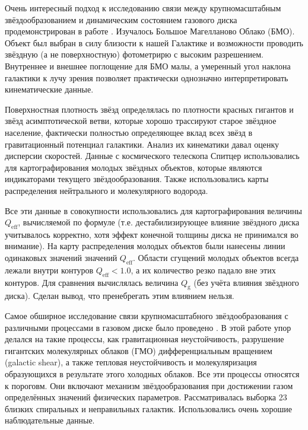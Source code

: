 \documentclass[russian,12pt]{article}
\begin{document}
Очень интересный подход к исследованию связи между крупномасштабным 
звёздообразованием и динамическим состоянием газового диска 
продемонстрирован в работе \cite{Yang+07}. Изучалось Большое 
Магелланово Облако (БМО). Объект был выбран в силу близости к нашей Галактике 
и возможности проводить звёздную (а не поверхностную) фотометрирю с 
высоким разрешением. Внутреннее и внешнее поглощение для БМО малы, а 
умеренный угол наклона галактики к лучу зрения позволяет практически 
однозначно интерпретировать кинематические данные. 

Поверхностная плотность звёзд определялась по плотности красных гигантов 
и звёзд асимптотической ветви, которые хорошо трассируют старое звёздное 
население, фактически полностью определяющее вклад всех звёзд в 
гравитационный потенциал галактики. Анализ их кинематики давал оценку 
дисперсии скоростей. Данные с космического телескопа 
Спитцер использовались для картографирования молодых звёздных объектов, 
которые являются индикаторами текущего звёздообразования. Также 
использовались карты распределения нейтрального и молекулярного 
водорода. 

Все эти данные в совокупности использовались для картографирования величины 
$Q_\mathrm{eff}$, вычисляемой по формуле \cite{Rafikov01} 
(т.е. дестабилизирующее влияние звёздного диска учитывалось корректно, 
хотя эффект конечной толщины диска не принимался во внимание). 
На карту распределения молодых объектов были нанесены линии одинаковых 
значений значений $Q_\mathrm{eff}$. Области сгущений молодых объектов 
всегда лежали внутри контуров $Q_\mathrm{eff} < 1.0$, а их количество 
резко падало вне этих контуров. Для сравнения вычислялась величина 
$Q_\mathrm{g}$ (без учёта влияния звёздного диска). Сделан вывод, что 
пренебрегать этим влиянием нельзя.

Самое обширное исследование связи крупномасштабного звёздообразования с 
различными процессами в газовом диске было проведено \cite{Leroy+08}. 
В этой работе упор делался на такие процессы, как гравитационная 
неустойчивость, разрушение гигантских молекулярных 
облаков (ГМО) дифференциальным вращением (galactic shear), а также 
тепловая неустойчивость и молекуляризация образующихся в результате 
этого холодных облаков. Все эти процессы относятся к пороговм.  
Они включают механизм звёздообразования при достижении газом 
определённых значений физических параметров. Рассматривалась выборка 23 
близких спиральных и неправильных галактик. 
Использовались очень хорошие наблюдательные данные. 
\end{document}
